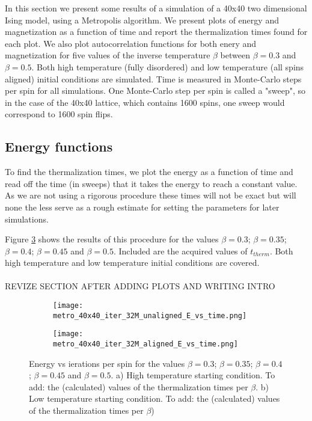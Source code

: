 \documentclass[11pt,a4paper]{article}
\begin{document}
In this section we present some results of a simulation of a 40x40 two dimensional Ising model, using a Metropolis algorithm.
 We present plots of energy and magnetization as a function of time and report the thermalization times found for each plot.
 We also plot autocorrelation functions for both enery and magnetization
 for five values of the inverse temperature $\beta$ between $\beta = 0.3$ and $\beta = 0.5$. 
 Both high temperature (fully disordered) and low temperature (all spins aligned) initial conditions are simulated.
 Time is measured in Monte-Carlo steps per spin for all simulations. One Monte-Carlo step per spin is called a "sweep", so
 in the case of the 40x40 lattice, which contains 1600 spins, one sweep would correspond to 1600 spin flips. 




\subsection{Energy functions}
To find the thermalization times, we plot the energy as a function of time and read off the time (in sweeps) that it takes
 the energy to reach a constant value. As we are not using a rigorous procedure these times will not be exact but will none 
 the less serve as a rough estimate for setting the parameters for later simulations. 

 
Figure \ref{fig:Evt} shows the results of this procedure for the values $\beta = 0.3$; $\beta = 0.35$;
 $\beta = 0.4$; $\beta = 0.45$ and $\beta = 0.5$. Included are the acquired values of $t_{therm}$. Both 
 high temperature and low temperature initial conditions are covered.
\\
\\
{\color{red}REVIZE SECTION AFTER ADDING PLOTS AND WRITING INTRO}

\begin{figure}[h!]
\centering
\begin{subfigure}{.5\textwidth}
  \centering
  \texttt{[image: metro\_40x40\_iter\_32M\_unaligned\_E\_vs\_time.png]}
  \caption{}
  \label{fig:Evt_highT}
\end{subfigure}%
\begin{subfigure}{.5\textwidth}
  \centering
  \texttt{[image: metro\_40x40\_iter\_32M\_aligned\_E\_vs\_time.png]}
  \caption{}
  \label{fig:Evt_lowT}
\end{subfigure}
\caption{Energy vs ierations per spin for the values $\beta = 0.3$; $\beta = 0.35$;
         $\beta = 0.4$; $\beta = 0.45$ and $\beta = 0.5$. a) High temperature starting condition. 
         {\color{red}To add: the (calculated) values of the thermalization times per $\beta$}.
         b) Low temperature starting condition.
         {\color{red}To add: the (calculated) values of the thermalization times per $\beta$)}}
\label{fig:Evt}
\end{figure}
\end{document}
